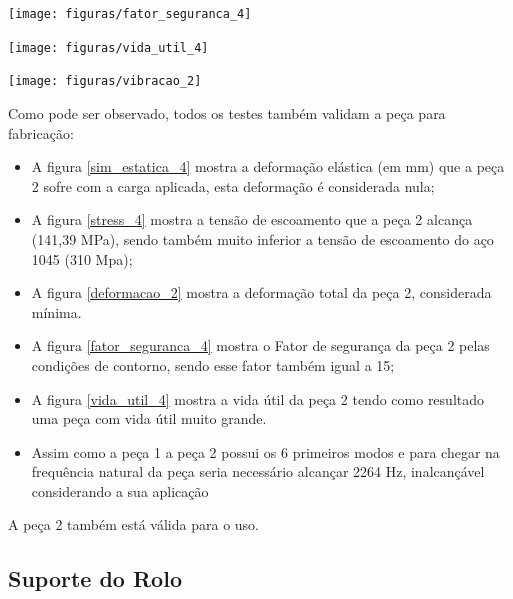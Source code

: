     \begin{center}
    	\texttt{[image: figuras/fator\_seguranca\_4]}
        \label{fator_seguranca_4}
    \end{center}

    \begin{center}
    	\texttt{[image: figuras/vida\_util\_4]}
        \label{vida_util_4}
    \end{center}

    \begin{center}
    	\texttt{[image: figuras/vibracao\_2]}
        \label{vibracao_2}
    \end{center}

    Como pode ser observado, todos os testes também validam a peça para fabricação:

    \begin{itemize}
        \item A figura \ref{sim_estatica_4} mostra a deformação elástica (em mm) que a peça 2 sofre com a carga aplicada, esta deformação é considerada nula;
        \item A figura \ref{stress_4} mostra a tensão de escoamento que a peça 2 alcança (141,39 MPa), sendo também muito inferior a tensão de escoamento do aço 1045 (310 Mpa);
        \item A figura \ref{deformacao_2} mostra a deformação total da peça 2, considerada mínima.
        \item A figura \ref{fator_seguranca_4} mostra o Fator de segurança da peça 2 pelas condições de contorno, sendo esse fator também igual a 15;
        \item A figura \ref{vida_util_4} mostra a vida útil da peça 2 tendo como resultado uma peça com vida útil muito grande.
        \item Assim como a peça 1 a peça 2 possui os 6 primeiros modos e para chegar na frequência natural da peça seria necessário alcançar 2264 Hz, inalcançável considerando a sua aplicação
    \end{itemize}

A peça 2 também está válida para o uso.

\subsection{Suporte do Rolo}

